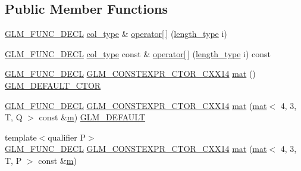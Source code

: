 \subsection*{Public Member Functions}
\begin{DoxyCompactItemize}
\item 
\mbox{\hyperlink{setup_8hpp_ab2d052de21a70539923e9bcbf6e83a51}{G\+L\+M\+\_\+\+F\+U\+N\+C\+\_\+\+D\+E\+CL}} \mbox{\hyperlink{structglm_1_1mat_3_014_00_013_00_01_t_00_01_q_01_4_ab7cb76d6290691108c8af724270e3b6c}{col\+\_\+type}} \& \mbox{\hyperlink{structglm_1_1mat_3_014_00_013_00_01_t_00_01_q_01_4_a35ef287c1963b05945a5bb159ff3ac70}{operator\mbox{[}$\,$\mbox{]}}} (\mbox{\hyperlink{structglm_1_1mat_3_014_00_013_00_01_t_00_01_q_01_4_a24f0f2085bebe0a6e79da267368e74f5}{length\+\_\+type}} i)
\item 
\mbox{\hyperlink{setup_8hpp_ab2d052de21a70539923e9bcbf6e83a51}{G\+L\+M\+\_\+\+F\+U\+N\+C\+\_\+\+D\+E\+CL}} \mbox{\hyperlink{structglm_1_1mat_3_014_00_013_00_01_t_00_01_q_01_4_ab7cb76d6290691108c8af724270e3b6c}{col\+\_\+type}} const  \& \mbox{\hyperlink{structglm_1_1mat_3_014_00_013_00_01_t_00_01_q_01_4_aaad4f07304cb7a1d857251e6cb39063a}{operator\mbox{[}$\,$\mbox{]}}} (\mbox{\hyperlink{structglm_1_1mat_3_014_00_013_00_01_t_00_01_q_01_4_a24f0f2085bebe0a6e79da267368e74f5}{length\+\_\+type}} i) const
\item 
\mbox{\hyperlink{setup_8hpp_ab2d052de21a70539923e9bcbf6e83a51}{G\+L\+M\+\_\+\+F\+U\+N\+C\+\_\+\+D\+E\+CL}} \mbox{\hyperlink{setup_8hpp_a0900f9145e68bf6061b6f5e7be3fa751}{G\+L\+M\+\_\+\+C\+O\+N\+S\+T\+E\+X\+P\+R\+\_\+\+C\+T\+O\+R\+\_\+\+C\+X\+X14}} \mbox{\hyperlink{structglm_1_1mat_3_014_00_013_00_01_t_00_01_q_01_4_a29e047d87eb90b8703e6955d135451b6}{mat}} () \mbox{\hyperlink{setup_8hpp_afb97a4e995bc004c0cbbfa22125b80ba}{G\+L\+M\+\_\+\+D\+E\+F\+A\+U\+L\+T\+\_\+\+C\+T\+OR}}
\item 
\mbox{\hyperlink{setup_8hpp_ab2d052de21a70539923e9bcbf6e83a51}{G\+L\+M\+\_\+\+F\+U\+N\+C\+\_\+\+D\+E\+CL}} \mbox{\hyperlink{setup_8hpp_a0900f9145e68bf6061b6f5e7be3fa751}{G\+L\+M\+\_\+\+C\+O\+N\+S\+T\+E\+X\+P\+R\+\_\+\+C\+T\+O\+R\+\_\+\+C\+X\+X14}} \mbox{\hyperlink{structglm_1_1mat_3_014_00_013_00_01_t_00_01_q_01_4_a59686658a0451cff1cda8c000e6b3579}{mat}} (\mbox{\hyperlink{structglm_1_1mat}{mat}}$<$ 4, 3, T, Q $>$ const \&\mbox{\hyperlink{_s_d_l__opengl__glext_8h_af593500c283bf1a787a6f947f503a5c2}{m}}) \mbox{\hyperlink{setup_8hpp_aefce7051c376a64ba89fa93a9f63bc2c}{G\+L\+M\+\_\+\+D\+E\+F\+A\+U\+LT}}
\item 
{\footnotesize template$<$qualifier P$>$ }\\\mbox{\hyperlink{setup_8hpp_ab2d052de21a70539923e9bcbf6e83a51}{G\+L\+M\+\_\+\+F\+U\+N\+C\+\_\+\+D\+E\+CL}} \mbox{\hyperlink{setup_8hpp_a0900f9145e68bf6061b6f5e7be3fa751}{G\+L\+M\+\_\+\+C\+O\+N\+S\+T\+E\+X\+P\+R\+\_\+\+C\+T\+O\+R\+\_\+\+C\+X\+X14}} \mbox{\hyperlink{structglm_1_1mat_3_014_00_013_00_01_t_00_01_q_01_4_afe2aacdb76797f1fcfef7e6d1268c764}{mat}} (\mbox{\hyperlink{structglm_1_1mat}{mat}}$<$ 4, 3, T, P $>$ const \&\mbox{\hyperlink{_s_d_l__opengl__glext_8h_af593500c283bf1a787a6f947f503a5c2}{m}})

\end{DoxyCompactItemize}
